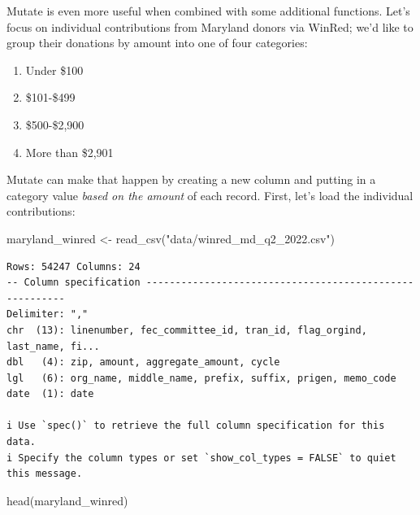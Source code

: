\documentclass[
  letterpaper,
  DIV=11,
  numbers=noendperiod]{scrreprt}
\newenvironment{Shaded}{\begin{snugshade}}{\end{snugshade}}
\newcommand{\FunctionTok}[1]{\textcolor[rgb]{0.28,0.35,0.67}{#1}}
\newcommand{\NormalTok}[1]{\textcolor[rgb]{0.00,0.23,0.31}{#1}}
\newcommand{\OtherTok}[1]{\textcolor[rgb]{0.00,0.23,0.31}{#1}}
\newcommand{\StringTok}[1]{\textcolor[rgb]{0.13,0.47,0.30}{#1}}
\providecommand{\tightlist}{%
  \setlength{\itemsep}{0pt}\setlength{\parskip}{0pt}}\usepackage{longtable,booktabs,array}
\begin{document}
Mutate is even more useful when combined with some additional functions.
Let's focus on individual contributions from Maryland donors via WinRed;
we'd like to group their donations by amount into one of four
categories:

\begin{enumerate}
\def\labelenumi{\arabic{enumi}.}
\tightlist
\item
  Under \$100
\item
  \$101-\$499
\item
  \$500-\$2,900
\item
  More than \$2,901
\end{enumerate}

Mutate can make that happen by creating a new column and putting in a
category value \emph{based on the amount} of each record. First, let's
load the individual contributions:

\begin{Shaded}
\begin{Highlighting}[]
\NormalTok{maryland\_winred }\OtherTok{\textless{}{-}} \FunctionTok{read\_csv}\NormalTok{(}\StringTok{"data/winred\_md\_q2\_2022.csv"}\NormalTok{)}
\end{Highlighting}
\end{Shaded}

\begin{verbatim}
Rows: 54247 Columns: 24
-- Column specification --------------------------------------------------------
Delimiter: ","
chr  (13): linenumber, fec_committee_id, tran_id, flag_orgind, last_name, fi...
dbl   (4): zip, amount, aggregate_amount, cycle
lgl   (6): org_name, middle_name, prefix, suffix, prigen, memo_code
date  (1): date

i Use `spec()` to retrieve the full column specification for this data.
i Specify the column types or set `show_col_types = FALSE` to quiet this message.
\end{verbatim}

\begin{Shaded}
\begin{Highlighting}[]
\FunctionTok{head}\NormalTok{(maryland\_winred)}
\end{Highlighting}
\end{Shaded}
\end{document}
